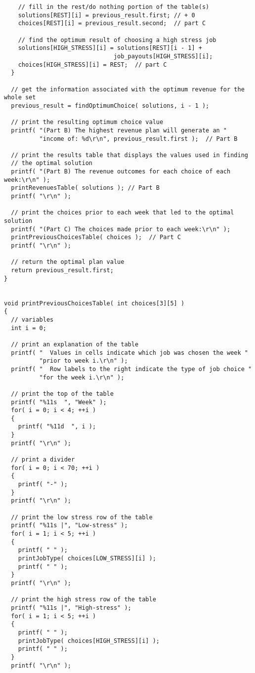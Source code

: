 \documentclass[11pts]{article}
\begin{document}
\begin{enumerate}
\begin{enumerate}
\begin{verbatim}
    // fill in the rest/do nothing portion of the table(s)
    solutions[REST][i] = previous_result.first; // + 0
    choices[REST][i] = previous_result.second;  // part C

    // find the optimum result of choosing a high stress job
    solutions[HIGH_STRESS][i] = solutions[REST][i - 1] +
                               job_payouts[HIGH_STRESS][i];
    choices[HIGH_STRESS][i] = REST;  // part C
  }

  // get the information associated with the optimum revenue for the whole set
  previous_result = findOptimumChoice( solutions, i - 1 );

  // print the resulting optimum choice value
  printf( "(Part B) The highest revenue plan will generate an "
          "income of: %d\r\n", previous_result.first );  // Part B

  // print the results table that displays the values used in finding
  // the optimal solution
  printf( "(Part B) The revenue outcomes for each choice of each week:\r\n" );
  printRevenuesTable( solutions ); // Part B
  printf( "\r\n" );

  // print the choices prior to each week that led to the optimal solution
  printf( "(Part C) The choices made prior to each week:\r\n" );
  printPreviousChoicesTable( choices );  // Part C
  printf( "\r\n" );

  // return the optimal plan value
  return previous_result.first;
}


void printPreviousChoicesTable( int choices[3][5] )
{
  // variables
  int i = 0;

  // print an explanation of the table
  printf( "  Values in cells indicate which job was chosen the week "
          "prior to week i.\r\n" );
  printf( "  Row labels to the right indicate the type of job choice "
          "for the week i.\r\n" );

  // print the top of the table
  printf( "%11s  ", "Week" );
  for( i = 0; i < 4; ++i )
  {
    printf( "%11d  ", i ); 
  }
  printf( "\r\n" );

  // print a divider
  for( i = 0; i < 70; ++i )
  {
    printf( "-" );
  }
  printf( "\r\n" );

  // print the low stress row of the table
  printf( "%11s |", "Low-stress" );
  for( i = 1; i < 5; ++i )
  {
    printf( " " ); 
    printJobType( choices[LOW_STRESS][i] );
    printf( " " );
  }
  printf( "\r\n" );

  // print the high stress row of the table
  printf( "%11s |", "High-stress" );
  for( i = 1; i < 5; ++i )
  {
    printf( " " ); 
    printJobType( choices[HIGH_STRESS][i] );
    printf( " " );
  }
  printf( "\r\n" );


\end{verbatim}
\end{enumerate}
\end{enumerate}
\end{document}
